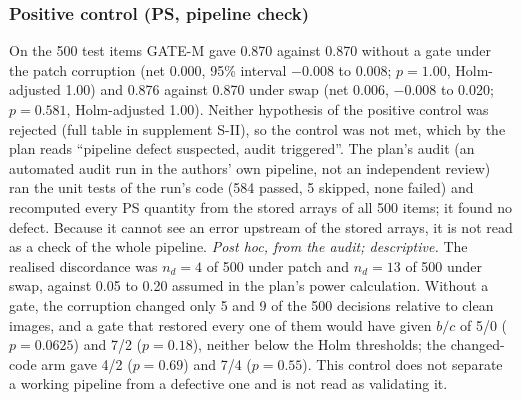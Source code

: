 \subsubsection{Positive control (PS, pipeline check)}
On the 500 test items GATE-M gave 0.870 against 0.870 without a gate under the patch corruption (net 0.000, 95\% interval $-0.008$ to
0.008; $p=1.00$, Holm-adjusted 1.00) and 0.876 against 0.870 under swap (net 0.006, $-0.008$ to 0.020; $p=0.581$, Holm-adjusted 1.00).
Neither hypothesis of the positive control was rejected (full table in supplement S-II), so the control was not met, which by the plan
reads ``pipeline defect suspected, audit triggered''.
The plan's audit (an automated audit run in the authors' own pipeline, not an independent review) ran the unit tests of the run's
code (584 passed, 5 skipped, none failed) and recomputed every PS quantity from the stored arrays of all 500 items; it found no defect.
Because it cannot see an error upstream of the stored arrays, it is not read as a check of the whole pipeline.
\emph{Post hoc, from the audit; descriptive.}
The realised discordance was $n_d=4$ of 500 under patch and $n_d=13$ of 500 under swap, against 0.05 to 0.20 assumed in the plan's power calculation.
Without a gate, the corruption changed only 5 and 9 of the 500 decisions relative to clean images, and a gate that restored every one of them would
have given $b/c$ of 5/0 ($p=0.0625$) and 7/2 ($p=0.18$), neither below the Holm thresholds; the changed-code arm gave 4/2 ($p=0.69$) and 7/4 ($p=0.55$).
This control does not separate a working pipeline from a defective one and is not read as validating it.

